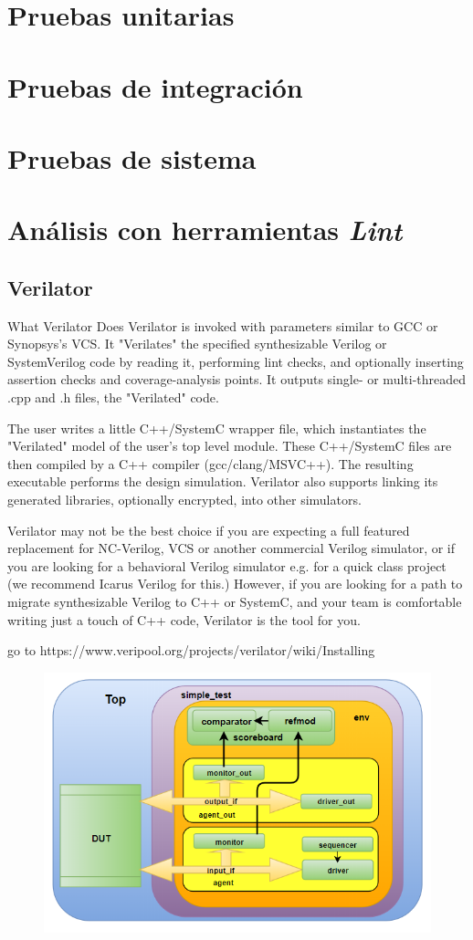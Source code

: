 \documentclass[a4paper]{article}
\begin{document}
\section{Pruebas unitarias}

\section{Pruebas de integración}

\section{Pruebas de sistema}

\section{Análisis con herramientas \textit{Lint}}

\subsection{Verilator}

 What Verilator Does
Verilator is invoked with parameters similar to GCC or Synopsys’s VCS. It "Verilates" the specified synthesizable Verilog or SystemVerilog code by reading it, performing lint checks, and optionally inserting assertion checks and coverage-analysis points. It outputs single- or multi-threaded .cpp and .h files, the "Verilated" code.

The user writes a little C++/SystemC wrapper file, which instantiates the "Verilated" model of the user’s top level module. These C++/SystemC files are then compiled by a C++ compiler (gcc/clang/MSVC++). The resulting executable performs the design simulation. Verilator also supports linking its generated libraries, optionally encrypted, into other simulators.

Verilator may not be the best choice if you are expecting a full featured replacement for NC-Verilog, VCS or another commercial Verilog simulator, or if you are looking for a behavioral Verilog simulator e.g. for a quick class project (we recommend Icarus Verilog for this.) However, if you are looking for a path to migrate synthesizable Verilog to C++ or SystemC, and your team is comfortable writing just a touch of C++ code, Verilator is the tool for you.

go to https://www.veripool.org/projects/verilator/wiki/Installing

  \begin{figure}[h]
    \includegraphics[width=0.6\linewidth]{pictures/uvm.png}
    \label{uvm_tb}
  \end{figure}
        
\newpage


\end{document}
